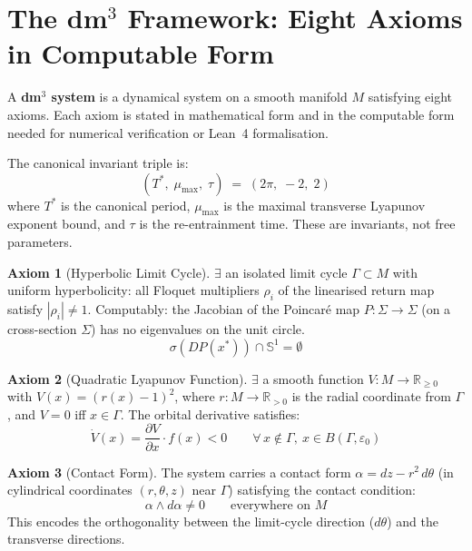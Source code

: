 \documentclass[11pt, a4paper]{article}
\theoremstyle{definition}
\newtheorem{axiom}{Axiom}[section]
\newcommand{\Gam}{\Gamma}
\newcommand{\mumax}{\mu_{\max}}
\newcommand{\Tstar}{T^*}
\newcommand{\EPS}{\varepsilon_0}
\begin{document}
\tableofcontents
\newpage

\section{The dm$^3$ Framework: Eight Axioms in Computable Form}
\label{sec:axioms}

A \textbf{dm$^3$ system} is a dynamical system on a smooth manifold $M$ satisfying eight axioms.
Each axiom is stated in mathematical form and in the computable form needed for numerical
verification or Lean~4 formalisation.

The canonical invariant triple is:
\begin{equation}
  (\Tstar,\; \mumax,\; \tau) \;=\; (2\pi,\; -2,\; 2)
  \label{eq:triple}
\end{equation}
where $\Tstar$ is the canonical period, $\mumax$ is the maximal transverse Lyapunov
exponent bound, and $\tau$ is the re-entrainment time. These are invariants, not free
parameters.

\begin{axiom}[Hyperbolic Limit Cycle]\label{ax:A1}
$\exists$ an isolated limit cycle $\Gam \subset M$ with uniform hyperbolicity: all Floquet
multipliers $\rho_i$ of the linearised return map satisfy $|\rho_i| \neq 1$.
Computably: the Jacobian of the Poincar\'e map $P : \Sigma \to \Sigma$ (on a cross-section
$\Sigma$) has no eigenvalues on the unit circle.
\[
  \sigma(DP(x^*)) \cap \mathbb{S}^1 = \emptyset
\]
\end{axiom}

\begin{axiom}[Quadratic Lyapunov Function]\label{ax:A2}
$\exists$ a smooth function $V: M \to \mathbb{R}_{\geq 0}$ with $V(x) = (r(x)-1)^2$, where
$r: M \to \mathbb{R}_{>0}$ is the radial coordinate from $\Gam$, and $V = 0$ iff $x \in \Gam$.
The orbital derivative satisfies:
\[
  \dot{V}(x) = \frac{\partial V}{\partial x} \cdot f(x) < 0
  \qquad \forall\, x \notin \Gam,\ x \in B(\Gam, \EPS)
\]
\end{axiom}

\begin{axiom}[Contact Form]\label{ax:A3}
The system carries a contact form $\alpha = dz - r^2\,d\theta$ (in cylindrical coordinates
$(r,\theta,z)$ near $\Gam$) satisfying the contact condition:
\[
  \alpha \wedge d\alpha \neq 0 \qquad \text{everywhere on } M
\]
This encodes the orthogonality between the limit-cycle direction ($d\theta$) and the
transverse directions.
\end{axiom}
\end{document}
